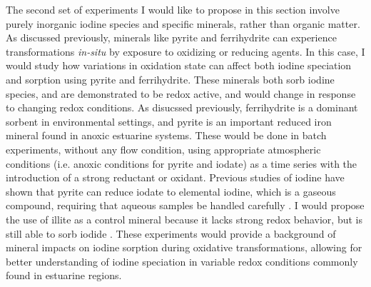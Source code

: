 \documentclass[twoside,12pt,titlepage]{article}
\begin{document}
\par The second set of experiments I would like to propose in this section involve purely inorganic iodine species and specific minerals, rather than organic matter. As discussed previously, minerals like pyrite and ferrihydrite can experience transformations \textit{in-situ} by exposure to oxidizing or reducing agents. In this case, I would study how variations in oxidation state can affect both iodine speciation and sorption using pyrite and ferrihydrite. These minerals both sorb iodine species, and are demonstrated to be redox active, and would change in response to changing redox conditions. As disucssed previously, ferrihydrite is a dominant sorbent in environmental settings, and pyrite is an important reduced iron mineral found in anoxic estuarine systems. These would be done in batch experiments, without any flow condition, using appropriate atmospheric conditions (i.e. anoxic conditions for pyrite and iodate) as a time series with the introduction of a strong reductant or oxidant. Previous studies of iodine have shown that pyrite can reduce iodate to elemental iodine, which is a gaseous compound, requiring that aqueous samples be handled carefully \cite{Kaplan2014}.  I would propose the use of illite as a control mineral because it lacks strong redox behavior, but is still able to sorb iodide \cite{Kaplan2014}. These experiments would provide a background of mineral impacts on iodine sorption during oxidative transformations, allowing for better understanding of iodine speciation in variable redox conditions commonly found in estuarine regions.
\end{document}
